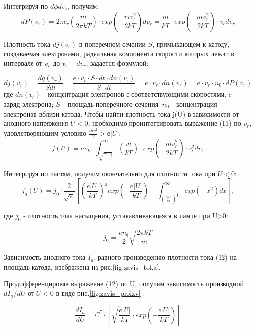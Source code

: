 \par 
Интегрируя по $d\phi dv_z$, получим:
\begin{equation}
    dP(v_r) = 2\pi v_r (\frac{m}{2\pi kT}) \cdot exp(-\frac{mv_{r}^{2}}{2kT}) dv_r = \frac{m}{kT} \cdot exp(-\frac{mv_{r}^{2}}{2kT}) \cdot v_r dv_r
\end{equation}
\par 
Плотность тока $dj(v_r)$ в поперечном сечении $S$, примыкающем к катоду,
создаваемая электронами, радиальная компонента скорости которых лежит в
интервале от $v_r$ до $v_r + dv_r$, задается формулой:

\begin{equation}
    dj(v_r) = \frac{dq(v_r)}{Sdt} = \frac{e \cdot v_r \cdot S  \cdot dt \cdot dn(v_r)}{S \cdot dt} = e \cdot v_r \cdot dn(v_r) = e \cdot v_r \cdot  n_0 \cdot dP(v_r)
\end{equation}
где  $dn(v_r)$ - концентрация электронов с соответствующими скоростями; $e$ - 
заряд
электрона; $S$ – площадь поперечного сечения; $n_0$ - концентрация электронов
вблизи катода.
Чтобы найти плотность тока j(U) в зависимости от анодного напряжения
$U<0$, необходимо проинтегрировать выражение (11) по $v_r$, удовлетворяющим
условию $\frac{mv_{r}^{2}}{2} > е|U|$:
\[j(U) = e n_0 \cdot \int_{\sqrt{\frac{2e|U|}{m}}}^{\infty} (\frac{m}{kT})\cdot 
exp(-\frac{mv_{r}^{2}}{2kT})\cdot v_{r}^{2} dv_{r}\]

\par
Интегрируя по частям, получим окончательно для плотности тока при
$U<0$:
\begin{equation}
    j_{a}(U)=j_0 \cdot \frac{2}{\sqrt{\pi}}
    \left[
    (\frac{e|U|}{kT})^{\frac{1}{2}}exp(-\frac{e|U|}{kT})+ \int_{(\frac{e|U|}{kT})^{\frac{1}{2}}}^{\infty}exp(-x^2)dx
    \right],
\end{equation}

где $j_0$ - плотность тока насыщения, устанавливающаяся в лампе при U>0:

\[j_0 = \frac{en_0}{2}\sqrt{\frac{2 \pi kT}{m}}\]

Зависимость анодного тока $I_a$, равного произведению плотности тока (12) на
площадь катода, изображена на рис.\ref{fig:zavis_toka}.

Продифференцировав выражение (12) по U, получим зависимость
производной $dI_a/dU$ от $U<0$ в виде рис.\ref{fig:zavis_proizv} :

\begin{equation}
    \frac{dI_a}{dU} = C^{''}\cdot
    \left[
    \sqrt{\frac{e|U|}{kT}} \cdot exp(-\frac{e|U|}{kT})
    \right]
\end{equation}

